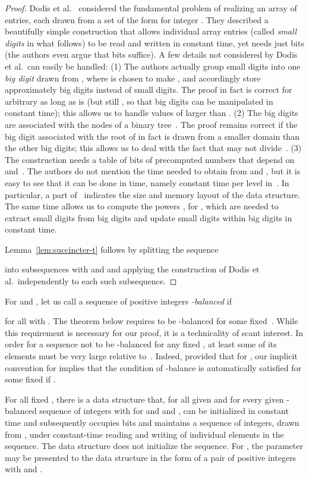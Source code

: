 \documentclass[envcountsame,envcountsect,undated,nolinenumbers]{lnthi}
\begin{document}
\begin{proof}
Dodis et al.~\cite{DodPT10}
considered the fundamental problem of
realizing an array of  entries,
each drawn from a set of the
form 
for integer .
They
described a beautifully simple
construction that allows individual array entries
(called \emph{small digits} in what follows) to
be read and written in constant time, yet needs
just  bits
(the authors even argue that
 bits suffice).
A few details not considered by
Dodis et al.\ can easily be handled:
(1) The authors actually group  small
digits into one
\emph{big digit} drawn from
, where
 is chosen to make
, and accordingly store
approximately  big digits
instead of  small digits.
The proof in fact is correct for arbitrary 
as long as 
is 
(but still , so that big
digits can be manipulated in constant time);
this allows us to handle
values of  larger than .
(2) The big digits are associated with the nodes
of a binary tree~.
The proof remains correct if the big digit associated
with the root of  in fact is drawn from a smaller domain
than the other big digits;
this allows us to deal with the fact that 
may not divide~.
(3) The construction needs a
table  of  bits
of precomputed numbers that depend on  and~.
The authors do not mention the time needed
to obtain
 from  and ,
but it is easy to see that it can be done in
 time, namely constant time per
level in~.
In particular,
a part of~ indicates
the size and memory layout of the data structure.
The same time allows us to compute the
powers , for , which are needed
to extract small digits from big digits and
update small digits within big digits in
constant time.

Lemma~\ref{lem:succincter-t} follows by
splitting
the sequence
 
into
 subsequences
 with 
and 
and applying the
construction of Dodis et al.\ independently
to each such subsequence.
\end{proof}

For  and , let us call a sequence
 of  positive integers 
\emph{-balanced} if

for all  with .
The theorem below requires  to
be -balanced for some fixed~.
While this requirement is necessary for our proof,
it is a technicality of scant interest.
In order for a sequence  not to be
-balanced for any fixed , at least some of
its elements must be very large relative to~.
Indeed, provided that  for ,
our implicit convention
 for  implies
that the condition of -balance is
automatically satisfied for some fixed  if
.

\begin{theorem}
\label{thm:succincter}For all fixed ,
there is a data structure
that, for all given 
and for every given
-balanced sequence
 of  integers
with  for 
and  and
,
can be initialized in constant time and subsequently
occupies  bits
and maintains a sequence
 of  integers,
drawn from
,
under constant-time reading and writing
of individual elements in the sequence.
The data structure does not initialize the sequence.
For , the parameter  may be presented
to the data structure in the form of a pair 
of positive integers with  and
.
\end{theorem}
\end{document}
